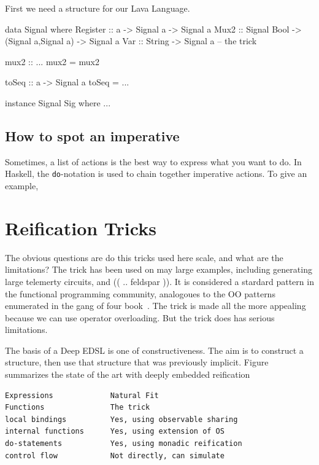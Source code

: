 \documentclass[11pt]{article}
\begin{document}
First we need a structure for our Lava Language.
\begin{Code}
        
data Signal where
  Register :: a -> Signal a                      -> Signal a
  Mux2     :: Signal Bool -> (Signal a,Signal a) -> Signal a
  Var      :: String                             -> Signal a -- the trick

mux2 :: ...
mux2 = mux2

toSeq :: a -> Signal a
toSeq = ...

instance Signal Sig where {...}

\end{Code}

\subsection{How to spot an imperative}

Sometimes, a list of actions is the best way to express what you want to do.
In Haskell, the \verb|do|-notation is used to chain together imperative actions.
To give an example, 

\section{Reification Tricks}

The obvious questions are do this tricks used here scale,
and what are the limitations? The trick has
been used on may large examples, including
generating large telemerty circuits, 
and (( .. feldspar )). It is considered a
stardard pattern in the functional programming
community, analogoues to the OO patterns
enumerated in the gang of four book~\cite{..}.
The trick is made all the more appealing
because we can use operator overloading.
But the trick does has serious limitations.

The basis of a Deep EDSL is one of constructiveness.
The aim is to construct a structure, then
use that structure that was previously implicit.
Figure summarizes the state of the art with
deeply embedded reification

\begin{verbatim}
Expressions             Natural Fit
Functions               The trick
local bindings          Yes, using observable sharing
internal functions      Yes, using extension of OS
do-statements           Yes, using monadic reification
control flow            Not directly, can simulate
\end{verbatim}
\end{document}
